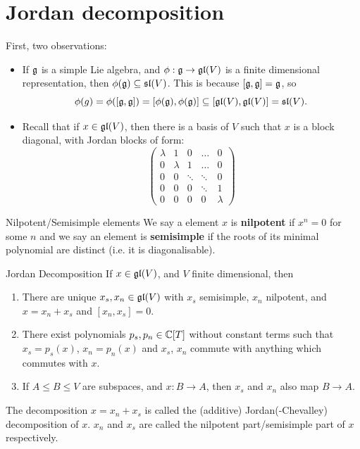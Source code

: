 \documentclass{article}
\begin{document}
\section{Jordan decomposition}
First, two observations: \begin{itemize}
    \item If $\mathfrak{g}$ is a simple Lie algebra, and $\phi : \mathfrak{g} \to \mathfrak{gl}(V)$ is a finite dimensional representation, then $\phi(\mathfrak{g}) \subseteq \mathfrak{sl}(V)$. This is because $[\mathfrak{g}, \mathfrak{g}] = \mathfrak{g}$, so \[\phi(g) = \phi([\mathfrak{g}, \mathfrak{g}]) = [\phi(\mathfrak{g}),\phi(\mathfrak{g})] \subseteq [\mathfrak{gl}(V), \mathfrak{gl}(V)] = \mathfrak{sl}(V).\]
    \item Recall that if $x \in \mathfrak{gl}(V)$, then there is a basis of $V$ such that $x$ is a block diagonal, with Jordan blocks of form:\[
    \begin{pmatrix}
        \lambda & 1 & 0 & \dots &  0\\
        0 & \lambda & 1 & \dots & 0\\
        0 & 0 & \ddots & \ddots & 0\\
        0 & 0 & 0 & \ddots &  1\\
        0 & 0 & 0 & 0 & \lambda
    \end{pmatrix}\]
\end{itemize}
\begin{fancydefine}{Nilpotent/Semisimple elements}
    We say a element $x$ is \textbf{nilpotent} if $x^{n}=0$ for some $n$ and we say an element is \textbf{semisimple} if the roots of its minimal polynomial are distinct (i.e. it is diagonalisable).
\end{fancydefine}
\begin{fancyprop}{Jordan Decomposition}
    If $x \in \mathfrak{gl}(V)$, and $V$ finite dimensional, then
    \begin{enumerate}
        \item There are unique $x_{s}, x_{n} \in \mathfrak{gl}(V)$ with $x_{s}$ semisimple, $x_{n}$ nilpotent, and $x= x_{n} + x_{s}$ and $[x_{n},x_{s}]=0$.
        \item There exist polynomials $p_{s},p_{n} \in \mathbb{C}[T]$ without constant terms such that $x_{s} = p_{s}(x)$, $x_{n} = p_{n}(x)$ and $x_{s}$, $x_{n}$ commute with anything which commutes with $x$.
        \item If $A \leq B \leq V$ are subspaces, and $x: B \to A$, then $x_{s}$ and $x_{n}$ also map $B \to A$.
    \end{enumerate}
    The decomposition $x=x_{n}+x_{s}$ is called the (additive) Jordan(-Chevalley) decomposition of $x$. $x_{n}$ and $x_{s}$ are called the nilpotent part/semisimple part of $x$ respectively.
\end{fancyprop}
\end{document}
